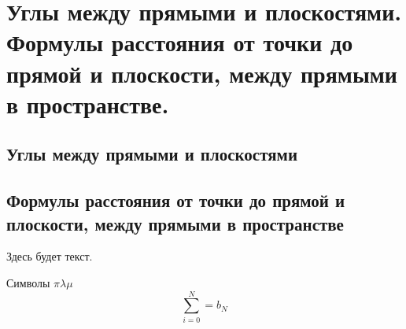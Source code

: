 \chapter{Углы между прямыми и плоскостями. Формулы расстояния от точки до прямой и плоскости, между прямыми в пространстве.}
\section{Углы между прямыми и плоскостями}
\section{Формулы расстояния от точки до прямой и плоскости, между прямыми в пространстве}
Здесь будет текст.

Символы $\pi\lambda\mu$
\label{a2} 
\begin{equation}
\sum_{i=0}^N=b_N
\end{equation}